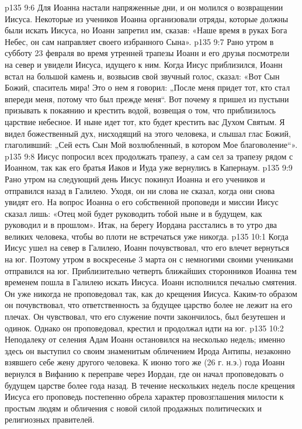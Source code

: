 \vs p135 9:6 Для Иоанна настали напряженные дни, и он молился о возвращении Иисуса. Некоторые из учеников Иоанна организовали отряды, которые должны были искать Иисуса, но Иоанн запретил им, сказав: «Наше время в руках Бога Небес, он сам направляет своего избранного Сына».
\vs p135 9:7 \pc Рано утром в субботу 23 февраля во время утренней трапезы Иоанн и его друзья посмотрели на север и увидели Иисуса, идущего к ним. Когда Иисус приблизился, Иоанн встал на большой камень и, возвысив свой звучный голос, сказал: «Вот Сын Божий, спаситель мира! Это о нем я говорил: „После меня придет тот, кто стал впереди меня, потому что был прежде меня“. Вот почему я пришел из пустыни призывать к покаянию и крестить водой, возвещая о том, что приблизилось царствие небесное. И ныне идет тот, кто будет крестить вас Духом Святым. Я видел божественный дух, нисходящий на этого человека, и слышал глас Божий, глаголивший: „Сей есть Сын Мой возлюбленный, в котором Мое благоволение“».
\vs p135 9:8 Иисус попросил всех продолжать трапезу, а сам сел за трапезу рядом с Иоанном, так как его братья Иаков и Иуда уже вернулись в Капернаум.
\vs p135 9:9 \pc Рано утром на следующий день Иисус покинул Иоанна и его учеников и отправился назад в Галилею. Уходя, он ни слова не сказал, когда они снова увидят его. На вопрос Иоанна о его собственной проповеди и миссии Иисус сказал лишь: «Отец мой будет руководить тобой ныне и в будущем, как руководил и в прошлом». Итак, на берегу Иордана расстались в то утро два великих человека, чтобы во плоти не встречаться уже никогда.
\vs p135 10:1 Когда Иисус ушел на север в Галилею, Иоанн почувствовал, что его влечет вернуться на юг. Поэтому утром в воскресенье 3 марта он с немногими своими учениками отправился на юг. Приблизительно четверть ближайших сторонников Иоанна тем временем пошла в Галилею искать Иисуса. Иоанн исполнился печалью смятения. Он уже никогда не проповедовал так, как до крещения Иисуса. Каким\hyp{}то образом он почувствовал, что ответственность за будущее царство более не лежит на его плечах. Он чувствовал, что его служение почти закончилось, был безутешен и одинок. Однако он проповедовал, крестил и продолжал идти на юг.
\vs p135 10:2 Неподалеку от селения Адам Иоанн остановился на несколько недель; именно здесь он выступил со своим знаменитым обличением Ирода Антипы, незаконно взявшего себе жену другого человека. К июню того же (26 г. н.э.) года Иоанн вернулся в Вифанию к переправе через Иордан, где он начал проповедовать о будущем царстве более года назад. В течение нескольких недель после крещения Иисуса его проповедь постепенно обрела характер провозглашения милости к простым людям и обличения с новой силой продажных политических и религиозных правителей.
